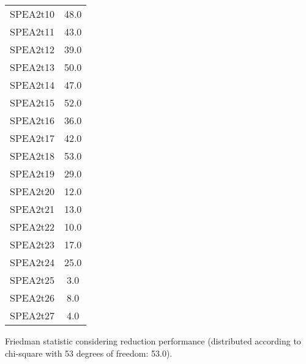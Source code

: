 \documentclass{article}
\begin{document}
\begin{table}[!htp]
\begin{tabular}{c|c}
SPEA2t10&48.0\\
SPEA2t11&43.0\\
SPEA2t12&39.0\\
SPEA2t13&50.0\\
SPEA2t14&47.0\\
SPEA2t15&52.0\\
SPEA2t16&36.0\\
SPEA2t17&42.0\\
SPEA2t18&53.0\\
SPEA2t19&29.0\\
SPEA2t20&12.0\\
SPEA2t21&13.0\\
SPEA2t22&10.0\\
SPEA2t23&17.0\\
SPEA2t24&25.0\\
SPEA2t25&3.0\\
SPEA2t26&8.0\\
SPEA2t27&4.0\\
\end{tabular}
\end{table}


Friedman statistic considering reduction performance (distributed according to chi-square with 53 degrees of freedom: 53.0).
\end{document}
